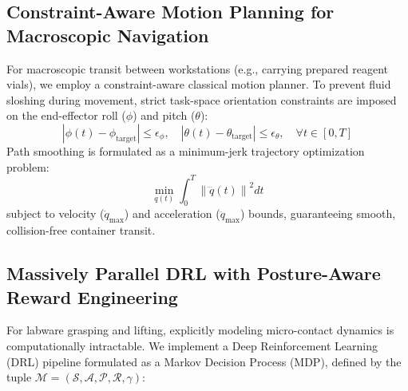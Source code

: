 \subsection{Constraint-Aware Motion Planning for Macroscopic Navigation}
\label{subsec:macro_planning}


For macroscopic transit between workstations (e.g., carrying prepared reagent vials), we employ a constraint-aware classical motion planner. To prevent fluid sloshing during movement, strict task-space orientation constraints are imposed on the end-effector roll ($\phi$) and pitch ($\theta$):
\begin{equation}
    |\phi(t) - \phi_{\text{target}}| \leq \epsilon_{\phi}, \quad |\theta(t) - \theta_{\text{target}}| \leq \epsilon_{\theta}, \quad \forall t \in [0, T]
\end{equation}
Path smoothing is formulated as a minimum-jerk trajectory optimization problem:
\begin{equation}
    \min_{q(t)} \int_{0}^{T} \left\| \dddot{q}(t) \right\|^2 dt
\end{equation}
subject to velocity ($\dot{q}_{\max}$) and acceleration ($\ddot{q}_{\max}$) bounds, guaranteeing smooth, collision-free container transit.

\subsection{Massively Parallel DRL with Posture-Aware Reward Engineering}
\label{subsec:arm_rl}

For labware grasping and lifting, explicitly modeling micro-contact dynamics is computationally intractable. We implement a Deep Reinforcement Learning (DRL) pipeline formulated as a Markov Decision Process (MDP), defined by the tuple $\mathcal{M} = (\mathcal{S}, \mathcal{A}, \mathcal{P}, \mathcal{R}, \gamma)$:

